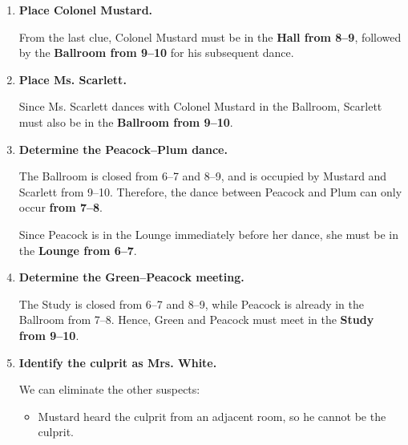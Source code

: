 \begin{tcolorbox}[
    title=\textbf{Human Reasoning Process},
    colback=white,
    colframe=black!40,
    boxrule=0.6pt,
    arc=1.5mm,
    fontupper=\scriptsize,
    fonttitle=\small\bfseries,
    left=2mm,
    right=2mm,
    top=1.5mm,
    bottom=1.5mm,
    boxsep=1mm,
    before skip=3pt,
    after skip=3pt
]




\begin{enumerate}[
    leftmargin=*,
    itemsep=1pt,
    topsep=2pt,
    parsep=0pt,
    partopsep=0pt
]

    \item \textbf{Place Colonel Mustard.}

    From the last clue, Colonel Mustard must be in the
    \textbf{Hall from 8--9}, followed by the
    \textbf{Ballroom from 9--10} for his subsequent dance.

    \item \textbf{Place Ms. Scarlett.}

    Since Ms. Scarlett dances with Colonel Mustard in the Ballroom,
    Scarlett must also be in the
    \textbf{Ballroom from 9--10}.

    \item \textbf{Determine the Peacock--Plum dance.}

    The Ballroom is closed from 6--7 and 8--9, and is occupied by
    Mustard and Scarlett from 9--10.
    Therefore, the dance between Peacock and Plum can only occur
    \textbf{from 7--8}.

    Since Peacock is in the Lounge immediately before her dance,
    she must be in the
    \textbf{Lounge from 6--7}.

    \item \textbf{Determine the Green--Peacock meeting.}

    The Study is closed from 6--7 and 8--9, while Peacock is already
    in the Ballroom from 7--8.
    Hence, Green and Peacock must meet in the
    \textbf{Study from 9--10}.

    \item \textbf{Identify the culprit as Mrs. White.}

    We can eliminate the other suspects:

    \begin{itemize}[leftmargin=*, itemsep=2pt]
        \item Mustard heard the culprit from an adjacent room,
        so he cannot be the culprit.


\end{itemize}
\end{enumerate}
\end{tcolorbox}
